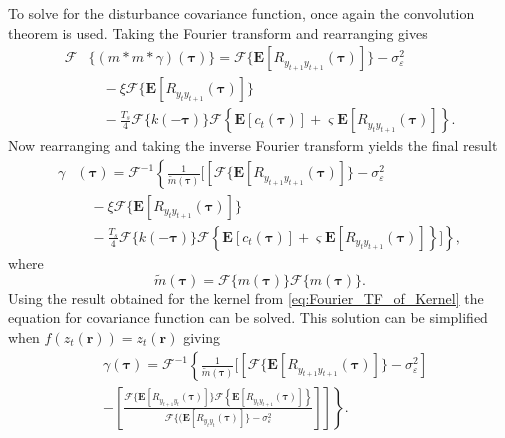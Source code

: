 \documentclass[10pt,twocolumn,twoside]{IEEEtran}
\begin{document}
To solve for the disturbance covariance function, once again the convolution theorem is used. Taking the Fourier transform and rearranging gives
\begin{align}
	\mathcal{F}&\{(m\ast m \ast \gamma)(\boldsymbol\tau)\} = \mathcal{F}\{\mathbf{E}[R_{y_{t+1}y_{t+1}}(\boldsymbol{\tau})]\}-\sigma_{\varepsilon}^2 \nonumber \\ 
	&\quad-\xi \mathcal{F}\{\mathbf{E}[R_{y_ty_{t+1}}(\boldsymbol{\tau})]\} \nonumber \\
	&\quad - \frac{T_s}{4} \mathcal{F}\{k(-\boldsymbol\tau)\}\mathcal{F}\left\{\mathbf{E}\left[c_t(\boldsymbol\tau)\right] + \varsigma \mathbf{E}\left[R_{y_ty_{t+1}}(\boldsymbol\tau)\right] \right\}.
\end{align}
Now rearranging and taking the inverse Fourier transform yields the final result 
 \begin{align}\label{eq:EM-MMGFourier2}   
	\gamma&(\boldsymbol\tau) =\mathcal{F}^{-1}\left\lbrace\frac{1}{\tilde{m}(\boldsymbol\tau)}\Bigg[\left[ \mathcal{F}\{\mathbf{E}[R_{y_{t+1}y_{t+1}}(\boldsymbol{\tau})]\}-\sigma_{\varepsilon}^2  \nonumber \right. \right. \\ 
	&\quad-\xi \mathcal{F}\{\mathbf{E}[R_{y_ty_{t+1}}(\boldsymbol{\tau})]\} \nonumber \\
	&\left.\quad - \frac{T_s}{4} \mathcal{F}\{k(-\boldsymbol\tau)\}\mathcal{F}\left\{\mathbf{E}\left[c_t(\boldsymbol\tau)\right] + \varsigma \mathbf{E}\left[R_{y_ty_{t+1}}(\boldsymbol\tau)\right] \right\}\Bigg]\right\rbrace,
\end{align}
where
\begin{equation}
 \tilde{m}(\boldsymbol\tau)=\mathcal{F}\{m(\boldsymbol\tau)\}\mathcal{F}\{m(\boldsymbol\tau)\}.
\end{equation}
Using the result obtained for the kernel from  \eqref{eq:Fourier_TF_of_Kernel}  the equation for covariance function can be solved.  This solution can be simplified when $f(z_t(\mathbf{r}))=z_t(\mathbf{r})$ giving
\begin{align}\label{eq:DiffusionDisturbanceSolution}
	&\gamma(\boldsymbol\tau) =\mathcal{F}^{-1}\left\lbrace \frac{1}{\tilde{m}(\boldsymbol\tau)}\Bigg[\left[\mathcal{F}\{\mathbf{E}[R_{y_{t+1}y_{t+1}}(\boldsymbol{\tau})]\}-\sigma_{\varepsilon}^2\right] \nonumber \right.\\
 &\left. \left.- \left[\frac{\mathcal{F}\{\mathbf{E}[R_{y_{t+1}y_t}(\boldsymbol{\tau})]\}\mathcal{F}\left\{\mathbf{E}\left[R_{y_ty_{t+1}}(\boldsymbol\tau)\right] \right\}}{\mathcal{F}\{(\mathbf{E}\left[R_{y_ty_t}(\boldsymbol\tau)\right]\} - \sigma_{\varepsilon}^2}\right]\right]\right\rbrace.
\end{align}
\end{document}
